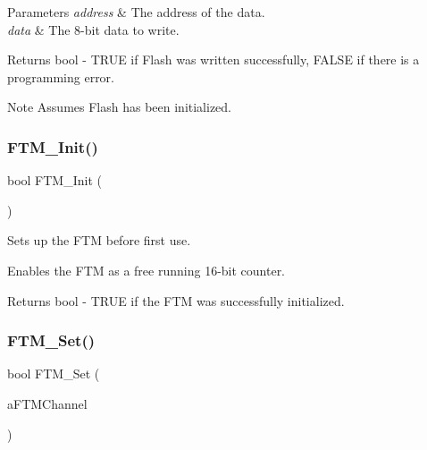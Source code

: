 \begin{DoxyParams}{Parameters}
{\em address} & The address of the data. \\
\hline
{\em data} & The 8-\/bit data to write. \\
\hline
\end{DoxyParams}
\begin{DoxyReturn}{Returns}
bool -\/ T\+R\+UE if Flash was written successfully, F\+A\+L\+SE if there is a programming error. 
\end{DoxyReturn}
\begin{DoxyNote}{Note}
Assumes Flash has been initialized. 
\end{DoxyNote}
\mbox{\label{group__main__module_ga6a8e07494e5be81d37cc695feb380e68}} 
\subsubsection{\texorpdfstring{F\+T\+M\+\_\+\+Init()}{FTM\_Init()}}
{\footnotesize\ttfamily bool F\+T\+M\+\_\+\+Init (\begin{DoxyParamCaption}{ }\end{DoxyParamCaption})}



Sets up the F\+TM before first use. 

Enables the F\+TM as a free running 16-\/bit counter. \begin{DoxyReturn}{Returns}
bool -\/ T\+R\+UE if the F\+TM was successfully initialized. 
\end{DoxyReturn}
\mbox{\label{group__main__module_gae4928af832114c8173e43d10e4144c1f}} 
\subsubsection{\texorpdfstring{F\+T\+M\+\_\+\+Set()}{FTM\_Set()}}
{\footnotesize\ttfamily bool F\+T\+M\+\_\+\+Set (\begin{DoxyParamCaption}\item[{const \hyperlink{struct_t_f_t_m_channel}{T\+F\+T\+M\+Channel} $\ast$const}]{a\+F\+T\+M\+Channel }\end{DoxyParamCaption})}



